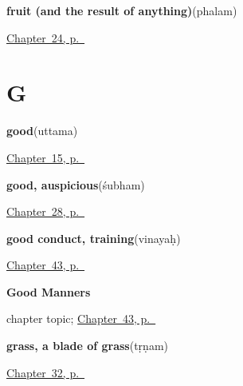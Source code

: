 \noindent\begin{minipage}[t]{\linewidth}
\raggedright
\textbf{fruit (and the result of anything)}\enspace\emph{}\enspace(phalam)\par
\footnotesize \hyperref[ch:sa-ask-for]{Chapter~24, p.~\pageref*{ch:sa-ask-for}}
\end{minipage}\par\smallskip

\section*{G}

\noindent\begin{minipage}[t]{\linewidth}
\raggedright
\textbf{good}\enspace\emph{}\enspace(uttama)\par
\footnotesize \hyperref[ch:sa-describing-things]{Chapter~15, p.~\pageref*{ch:sa-describing-things}}
\end{minipage}\par\smallskip

\noindent\begin{minipage}[t]{\linewidth}
\raggedright
\textbf{good, auspicious}\enspace\emph{}\enspace(śubham)\par
\footnotesize \hyperref[ch:sa-leave-more]{Chapter~28, p.~\pageref*{ch:sa-leave-more}}
\end{minipage}\par\smallskip

\noindent\begin{minipage}[t]{\linewidth}
\raggedright
\textbf{good conduct, training}\enspace\emph{}\enspace(vinayaḥ)\par
\footnotesize \hyperref[ch:sa-good-manners]{Chapter~43, p.~\pageref*{ch:sa-good-manners}}
\end{minipage}\par\smallskip

\noindent\begin{minipage}[t]{\linewidth}
\raggedright
\textbf{Good Manners}\par
\footnotesize chapter topic; \hyperref[ch:sa-good-manners]{Chapter~43, p.~\pageref*{ch:sa-good-manners}}
\end{minipage}\par\smallskip

\noindent\begin{minipage}[t]{\linewidth}
\raggedright
\textbf{grass, a blade of grass}\enspace\emph{}\enspace(tṛṇam)\par
\footnotesize \hyperref[ch:sa-tree]{Chapter~32, p.~\pageref*{ch:sa-tree}}
\end{minipage}\par\smallskip

